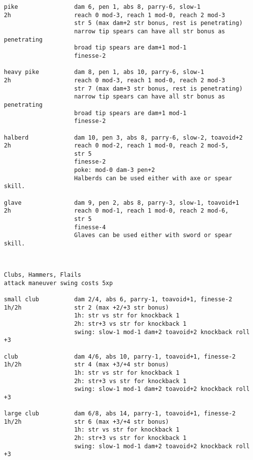 \begin{verbatim}
pike                dam 6, pen 1, abs 8, parry-6, slow-1
2h                  reach 0 mod-3, reach 1 mod-0, reach 2 mod-3
                    str 5 (max dam+2 str bonus, rest is penetrating)
                    narrow tip spears can have all str bonus as penetrating
                    broad tip spears are dam+1 mod-1
                    finesse-2

heavy pike          dam 8, pen 1, abs 10, parry-6, slow-1
2h                  reach 0 mod-3, reach 1 mod-0, reach 2 mod-3
                    str 7 (max dam+3 str bonus, rest is penetrating)
                    narrow tip spears can have all str bonus as penetrating
                    broad tip spears are dam+1 mod-1
                    finesse-2

halberd             dam 10, pen 3, abs 8, parry-6, slow-2, toavoid+2
2h                  reach 0 mod-2, reach 1 mod-0, reach 2 mod-5,
                    str 5
                    finesse-2
                    poke: mod-0 dam-3 pen+2
                    Halberds can be used either with axe or spear skill.

glave               dam 9, pen 2, abs 8, parry-3, slow-1, toavoid+1
2h                  reach 0 mod-1, reach 1 mod-0, reach 2 mod-6,
                    str 5
                    finesse-4
                    Glaves can be used either with sword or spear skill.



\end{verbatim} \pagebreak[3] \begin{verbatim}
Clubs, Hammers, Flails
attack maneuver swing costs 5xp

small club          dam 2/4, abs 6, parry-1, toavoid+1, finesse-2
1h/2h               str 2 (max +2/+3 str bonus)
                    1h: str vs str for knockback 1
                    2h: str+3 vs str for knockback 1
                    swing: slow-1 mod-1 dam+2 toavoid+2 knockback roll +3

club                dam 4/6, abs 10, parry-1, toavoid+1, finesse-2
1h/2h               str 4 (max +3/+4 str bonus)
                    1h: str vs str for knockback 1
                    2h: str+3 vs str for knockback 1
                    swing: slow-1 mod-1 dam+2 toavoid+2 knockback roll +3

large club          dam 6/8, abs 14, parry-1, toavoid+1, finesse-2
1h/2h               str 6 (max +3/+4 str bonus)
                    1h: str vs str for knockback 1
                    2h: str+3 vs str for knockback 1
                    swing: slow-1 mod-1 dam+2 toavoid+2 knockback roll +3


\end{verbatim}
